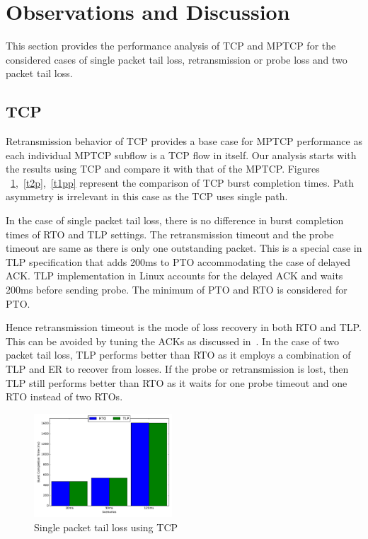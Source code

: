 \documentclass[10pt,conference,compsoc]{IEEEtran}
\begin{document}
\section{Observations and Discussion}\label{disc}
This section provides the performance analysis of TCP and MPTCP for the considered cases of single packet tail loss, retransmission or probe loss and two packet 
tail loss.

\subsection{TCP}
Retransmission behavior of TCP provides a base case for MPTCP performance as each individual MPTCP subflow is a TCP flow in itself. Our analysis
starts with the results using TCP and compare it with that of the MPTCP. Figures ~\ref{t1p},~\ref{t2p},~\ref{t1pp} represent the comparison of TCP 
burst completion times. Path asymmetry is irrelevant in this case as the TCP uses single path.

In the case of single packet tail loss, there is no difference in burst completion times of RTO and TLP settings. The retransmission
timeout and the probe timeout are same as there is only one outstanding packet. This is a special case in TLP
specification that adds 200ms to PTO accommodating the case of delayed ACK. TLP implementation in Linux accounts
for the delayed ACK and waits 200ms before sending probe. The minimum of PTO and RTO is considered for PTO.

Hence retransmission timeout is the mode of loss recovery in both RTO and TLP. This can be avoided by tuning
the ACKs as discussed in~\cite{Rajiullah:2015}. In the case of two packet tail loss, TLP performs better than RTO as it employs a combination of TLP and ER to recover from losses. 
If the probe or retransmission is lost, then TLP still performs better than RTO as it waits for one probe timeout and one RTO instead of two RTOs.

\begin{figure}[!ht]
\begin{center}
\includegraphics[angle=0, width=0.46\textwidth,natwidth=578.16,natheight=433.62]{plots/T1P.pdf}
\caption{Single packet tail loss using TCP}\label{t1p}
\end{center}
\end{figure}
\end{document}
